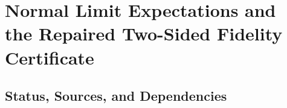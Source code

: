 
\section{Normal Limit Expectations and the Repaired Two-Sided Fidelity Certificate}
\label{sec:normal-limit-expectations-fidelity}

\subsection{Status, Sources, and Dependencies}

